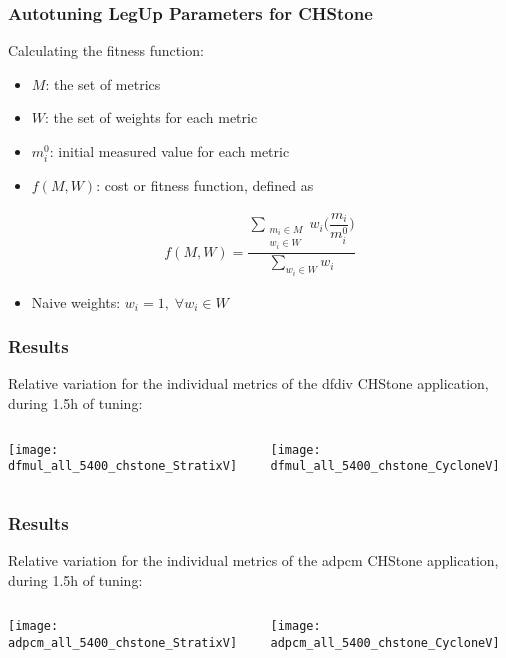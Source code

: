 \documentclass[10pt, compress, aspectratio=169]{beamer}
\begin{document}
\begin{frame}
    \frametitle{Autotuning LegUp Parameters for CHStone}
    Calculating the \alert{fitness function}:

    \begin{itemize}
        \item $M$: the set of \alert{metrics}
        \item $W$: the set of \alert{weights for each metric}
        \item $m_{i}^{0}$: \alert{initial measured value} for each metric
        \item $f(M,W)$: \alert{cost} or \alert{fitness function}, defined as
    \end{itemize}
    \begin{align*}
        f(M, W) = \dfrac{\sum\limits_{\substack{m_i \in M \\ w_i \in W}}{w_i\Big(\dfrac{m_i}{m_{i}^{0}}\Big)}}{\sum\limits_{w_i \in W}{w_i}}
    \end{align*}
    \begin{itemize}
        \item \alert{Naive weights}: $w_i = 1, \; \forall w_i \in W$
    \end{itemize}
\end{frame}

\begin{frame}
    \frametitle{Results}
    Relative variation for the \alert{individual metrics} of the \alert{dfdiv}
    CHStone application, during \alert{1.5h of tuning}:
    \begin{columns}[T,onlytextwidth]
        \begin{center}
            \texttt{[image: dfmul\_all\_5400\_chstone\_StratixV]}
        \end{center}

        \begin{center}
            \texttt{[image: dfmul\_all\_5400\_chstone\_CycloneV]}
        \end{center}

    \end{columns}
\end{frame}

\begin{frame}
    \frametitle{Results}
    Relative variation for the \alert{individual metrics} of the \alert{adpcm}
    CHStone application, during \alert{1.5h of tuning}:
    \begin{columns}[T,onlytextwidth]
        \begin{center}
            \texttt{[image: adpcm\_all\_5400\_chstone\_StratixV]}
        \end{center}

        \begin{center}
            \texttt{[image: adpcm\_all\_5400\_chstone\_CycloneV]}
        \end{center}

    \end{columns}
\end{frame}
\end{document}
